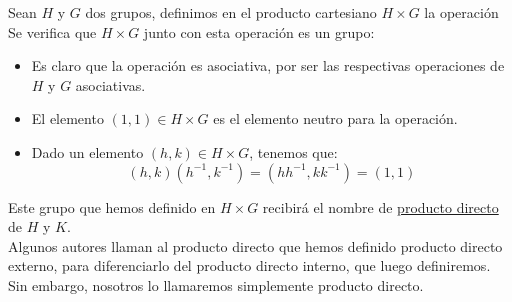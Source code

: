 \begin{definicion}
    Sean $H$ y $G$ dos grupos, definimos en el producto cartesiano $H\times G$ la operación
    Se verifica que $H\times G$ junto con esta operación es un grupo:
    \begin{itemize}
        \item Es claro que la operación es asociativa, por ser las respectivas operaciones de $H$ y $G$ asociativas.
        \item El elemento $(1,1)\in H\times G$ es el elemento neutro para la operación.
        \item Dado un elemento $(h,k)\in H\times G$, tenemos que:
            \begin{equation*}
                (h,k)(h^{-1},k^{-1}) = (hh^{-1},kk^{-1}) = (1, 1)
            \end{equation*}
    \end{itemize}
    Este grupo que hemos definido en $H\times G$ recibirá el nombre de \underline{producto directo} de $H$ y $K$.\\

    Algunos autores llaman al producto directo que hemos definido producto directo externo, para diferenciarlo del producto directo interno, que luego definiremos. Sin embargo, nosotros lo llamaremos simplemente producto directo.
\end{definicion}

